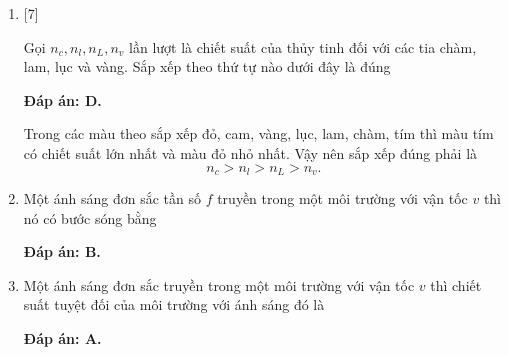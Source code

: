 \begin{enumerate}[label=\bfseries Câu \arabic*:]
{	}
	
	\item {} [7]
	\cauhoi
	{Gọi $n_{c}, n_{l}, n_{L}, n_{v}$ lần lượt là chiết suất của thủy tinh đối với các tia chàm, lam, lục và vàng. Sắp xếp theo thứ tự nào dưới đây là đúng
	}
	
	\loigiai
	{		\textbf{Đáp án: D.}
		
		Trong các màu theo sắp xếp đỏ, cam, vàng, lục, lam, chàm, tím thì màu tím có chiết suất lớn nhất và màu đỏ nhỏ nhất. Vậy nên sắp xếp đúng phải là
		$$
		n_{c} > n_{l} > n_{L} > n_{v}.
		$$
		
	}
		\item {} 
	\cauhoi
	{Một ánh sáng đơn sắc tần số $f$ truyền trong một môi trường với vận tốc $v$ thì nó có bước sóng bằng
		
	}
	
	\loigiai
	{		\textbf{Đáp án: B.}
		
	
		
	}
		\item {} 
	\cauhoi
	{
		Một ánh sáng đơn sắc truyền trong một môi trường với vận tốc $v$ thì chiết suất tuyệt đối của môi trường với ánh sáng đó là
		
	}
	
	\loigiai
	{		\textbf{Đáp án: A.}
		
}
\end{enumerate}
